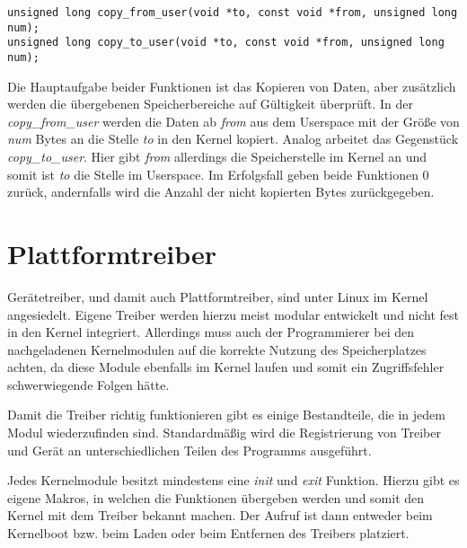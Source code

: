 \begin{lstfloat}
\begin{lstlisting}
unsigned long copy_from_user(void *to, const void *from, unsigned long num);
unsigned long copy_to_user(void *to, const void *from, unsigned long num);
\end{lstlisting}
\end{lstfloat}

Die Hauptaufgabe beider Funktionen ist das Kopieren von Daten, aber zusätzlich werden die übergebenen Speicherbereiche auf Gültigkeit überprüft. 
In der \textit{copy\_from\_user} werden die Daten ab \textit{from} aus dem Userspace mit der Größe von \textit{num} Bytes an die Stelle \textit{to} in den Kernel kopiert.
Analog arbeitet das Gegenstück \textit{copy\_to\_user}. Hier gibt \textit{from} allerdings die Speicherstelle im Kernel an und somit ist \textit{to} die Stelle im Userspace.
Im Erfolgsfall geben beide Funktionen 0 zurück, andernfalls wird die Anzahl der nicht kopierten Bytes zurückgegeben. \citep[S. 250f.]{schroder2009embedded}%

\section{Plattformtreiber}\label{sec:plat_t}
Gerätetreiber, und damit auch Plattformtreiber, sind unter Linux im Kernel angesiedelt. Eigene Treiber werden hierzu meist modular entwickelt und nicht fest in den Kernel integriert. Allerdings muss auch der Programmierer bei den nachgeladenen Kernelmodulen auf die korrekte Nutzung des Speicherplatzes achten, da diese Module ebenfalls im Kernel laufen und somit ein Zugriffsfehler schwerwiegende Folgen hätte. \citep[S. 231ff.]{schroder2009embedded}%

Damit die Treiber richtig funktionieren gibt es einige Bestandteile, die in jedem Modul wiederzufinden sind. Standardmäßig wird die Registrierung von Treiber und Gerät an unterschiedlichen Teilen des Programms ausgeführt. \cite{corbetplatform} %




Jedes Kernelmodule besitzt mindestens eine \textit{init} und \textit{exit} Funktion. Hierzu gibt es eigene Makros, in welchen die Funktionen übergeben werden und somit den Kernel mit dem Treiber bekannt machen. Der Aufruf ist dann entweder beim Kernelboot bzw. beim Laden oder beim Entfernen des Treibers platziert. \cite[linux/module.h, Zeile 79ff.]{linuxsourceinclude}


